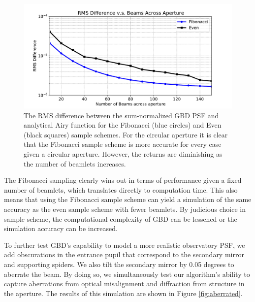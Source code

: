 \begin{figure}[H]
    \centering
    \includegraphics[width=\textwidth]{rms_vs_nbeamlets.pdf}
    \caption{The RMS difference between the sum-normalized GBD PSF and analytical Airy function for the Fibonacci (blue circles) and Even (black squares) sample schemes. For the circular aperture it is clear that the Fibonacci sample scheme is more accurate for every case given a circular aperture. However, the returns are diminishing as the number of beamlets increases.} 
    \label{fig:rms_vs_sample_airy}
\end{figure}

The Fibonacci sampling clearly wins out in terms of performance given a fixed number of beamlets, which translates directly to computation time. This also means that using the Fibonacci sample scheme can yield a simulation of the same accuracy as the even sample scheme with fewer beamlets. By judicious choice in sample scheme, the computational complexity of GBD can be lessened or the simulation accuracy can be increased.

To further test GBD's capability to model a more realistic observatory PSF, we add obscurations in the entrance pupil that correspond to the secondary mirror and supporting spiders. We also tilt the secondary mirror by 0.05 degrees to aberrate the beam. By doing so, we simultaneously test our algorithm's ability to capture aberrations from optical misalignment and diffraction from structure in the aperture. The results of this simulation are shown in Figure \ref{fig:aberrated}.


